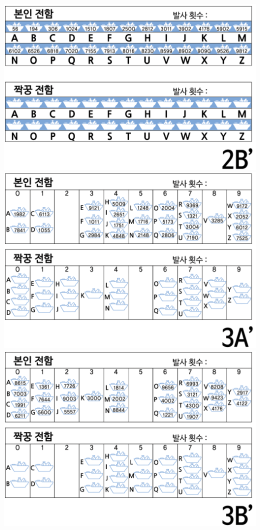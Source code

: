 \documentclass[]{article}
\begin{document}
\includegraphics{csunplugged/02-part/img/ch06-search/06-search-01-battleship-2B-dash.png}
\includegraphics{csunplugged/02-part/img/ch06-search/06-search-01-battleship-3A-dash.png}
\includegraphics{csunplugged/02-part/img/ch06-search/06-search-01-battleship-3B-dash.png}
\end{document}
